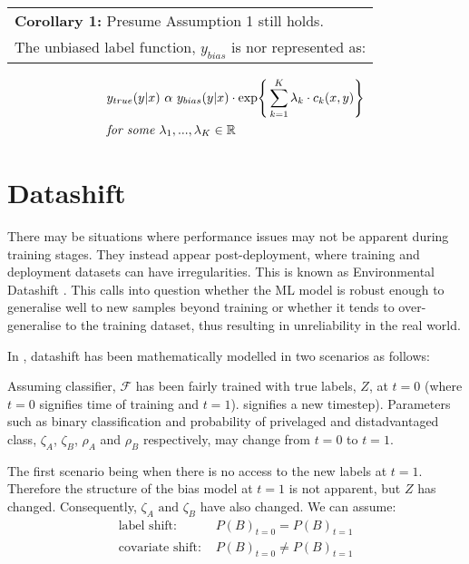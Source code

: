 \bigskip
\begin{center}
    \begin{tabular}{l}
        \textbf{Corollary 1: } Presume Assumption 1 still holds. \\
        The unbiased label function, $y_{bias}$ is nor represented as:
    \end{tabular}

    \begin{equation}
        \label{eq:Corollary}
        \begin{split}
            & y_{true}(y|x) \text{ }\alpha \text{ } y_{bias}(y|x) \cdot \text{exp} \Bigg\{ \sum^K_{k=1} \lambda_k \cdot c_k(x,y)\Bigg\} \\
            & \textit{for some } \lambda_1, ..., \lambda_K \in \mathbb{R}
        \end{split}
    \end{equation}
\end{center}

\section*{Datashift}
There may be situations where performance issues may not be apparent during training stages. 
They instead appear post-deployment, where training and deployment datasets can have irregularities. 
This is known as Environmental Datashift \cite{saria2019tutorial}. 
This calls into question whether the ML model is robust enough to generalise well to new samples beyond training or whether it tends to over-generalise to the training dataset,
thus resulting in unreliability in the real world.

In \cite{shift}, datashift has been mathematically modelled in two scenarios as follows:

Assuming classifier, $\mathcal{F}$ has been fairly trained with true labels, $Z$, at $t = 0$ (where $t = 0$ signifies time of training and $t = 1$). signifies a new timestep).
Parameters such as binary classification and probability of privelaged and distadvantaged class, $\zeta_A$,  $\zeta_B$, $\rho_A$ and $\rho_B$ respectively,
may change from  $t = 0$ to $t = 1$.

The first scenario being when there is no access to the new labels at $t = 1$. 
Therefore the structure of the bias model at $t = 1$ is not apparent, but $Z$ has changed.
Consequently, $\zeta_A \text{ and } \zeta_B$ have also changed. 
We can assume:
\begin{align*}
    \text{label shift: } & P(B)_{t=0} = P(B)_{t=1} \\
    \text{covariate shift: } & P(B)_{t=0} \neq P(B)_{t=1}
\end{align*}

